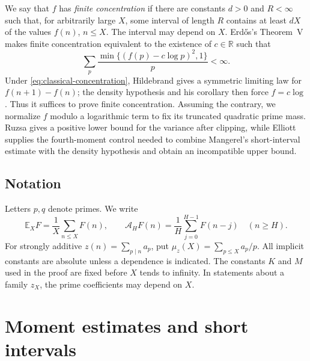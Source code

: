 \documentclass[11pt]{article}
\numberwithin{equation}{section}
\newcommand{\R}{\mathbb R}
\newcommand{\E}{\mathbb E}
\begin{document}
We say that $f$ has \emph{finite concentration} if there are constants
$d>0$ and $R<\infty$ such that, for arbitrarily large $X$, some interval
of length $R$ contains at least $dX$ of the values $f(n)$, $n\le X$.
The interval may depend on $X$. Erd\H{o}s's Theorem~V
\cite{Erdos} makes finite concentration equivalent to the existence
of $c\in\R$ such that
\begin{equation}\label{eq:classical-concentration}
 \sum_p\frac{\min\{(f(p)-c\log p)^2,1\}}p<\infty.
\end{equation}
Under \eqref{eq:classical-concentration}, Hildebrand gives a symmetric
limiting law for $f(n+1)-f(n)$; the density hypothesis and his corollary
then force $f=c\log$. Thus it suffices to prove finite concentration.
Assuming the contrary, we normalize $f$ modulo a logarithmic term to fix
its truncated quadratic prime mass. Ruzsa gives a positive lower bound
for the variance after clipping, while Elliott supplies the fourth-moment
control needed to combine Mangerel's short-interval estimate with the
density hypothesis and obtain an incompatible upper bound.

\subsection*{Notation}
Letters $p,q$ denote primes. We write
\[
 \E_X F=\frac1X\sum_{n\le X}F(n),\qquad
 \mathcal A_H F(n)=\frac1H\sum_{j=0}^{H-1}F(n-j)\quad(n\ge H).
\]
For strongly additive $z(n)=\sum_{p\mid n}a_p$,
put $\mu_z(X)=\sum_{p\le X}a_p/p$.
All implicit constants are absolute unless a dependence is indicated.
The constants $K$ and $M$ used in the proof are fixed before $X$ tends
to infinity. In statements about a family $z_X$, the prime coefficients
may depend on $X$.

\section{Moment estimates and short intervals}
\end{document}
